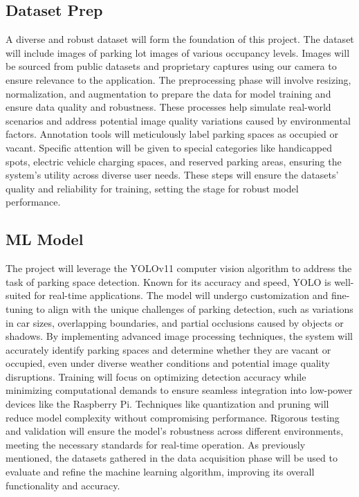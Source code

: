 \documentclass[conference]{IEEEtran}
\begin{document}
\subsection{Dataset Prep}

A diverse and robust dataset will form the foundation of this project. 
The dataset will include images of parking lot images of various occupancy levels. 
Images will be sourced from public datasets and proprietary captures using our camera to ensure relevance to the application. 
The preprocessing phase will involve resizing, 
normalization, 
and augmentation to prepare the data for model training and ensure data quality and robustness. 
These processes help simulate real-world scenarios and address potential image quality variations caused by environmental factors. 
Annotation tools will meticulously label parking spaces as occupied or vacant. 
Specific attention will be given to special categories like handicapped spots, 
electric vehicle charging spaces, 
and reserved parking areas, 
ensuring the system’s utility across diverse user needs. 
These steps will ensure the datasets’ quality and reliability for training, 
setting the stage for robust model performance.

\subsection{ML Model}

The project will leverage the YOLOv11 computer vision algorithm \cite{yolo11_ultralytics} to address the task of parking space detection. 
Known for its accuracy and speed, 
YOLO is well-suited for real-time applications.
The model will undergo customization and fine-tuning to align with the unique challenges of parking detection, 
such as variations in car sizes, 
overlapping boundaries, 
and partial occlusions caused by objects or shadows. 
By implementing advanced image processing techniques, 
the system will accurately identify parking spaces and determine whether they are vacant or occupied, 
even under diverse weather conditions and potential image quality disruptions. 
Training will focus on optimizing detection accuracy while minimizing computational demands to ensure seamless integration into low-power devices like the Raspberry Pi. 
Techniques like quantization and pruning will reduce model complexity without compromising performance. 
Rigorous testing and validation will ensure the model’s robustness across different environments, 
meeting the necessary standards for real-time operation. 
As previously mentioned, 
the datasets gathered in the data acquisition phase will be used to evaluate and refine the machine learning algorithm, 
improving its overall functionality and accuracy.
\end{document}
